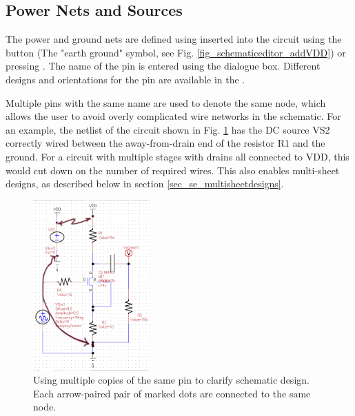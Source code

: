 \subsection{Power Nets and Sources}
\label{subsec_se_powernetsandsources}

The power and ground nets are defined using inserted into the circuit using the  button (The "earth ground" symbol, see Fig. \ref{fig_schematiceditor_addVDD}) or pressing .  The name of the pin is entered using the dialogue box.   Different designs and orientations for the pin are available in the .


Multiple pins with the same name are used to denote the same node, which allows the user to avoid overly complicated wire networks in the schematic.  For an example, the netlist of the circuit shown in Fig. \ref{fig_schematiceditor_multiplepins} has the DC source \textsf{VS2} correctly wired between the away-from-drain end of the resistor \textsf{R1} and the ground.  For a circuit with multiple stages with drains all connected to \textsf{VDD}, this would cut down on the number of required wires.  This also enables multi-sheet designs, as described below in section \ref{sec_se_multisheetdesigns}.

\begin{figure}
    \includegraphics[width=0.4\textwidth]{./figures/schematic_editor_figures/SchematicEditor_MultiPinUseExample.png}
    \caption{{Using multiple copies of the same pin to clarify schematic design.  Each arrow-paired pair of marked dots are connected to the same node.}}
  \label{fig_schematiceditor_multiplepins}
\end{figure}

